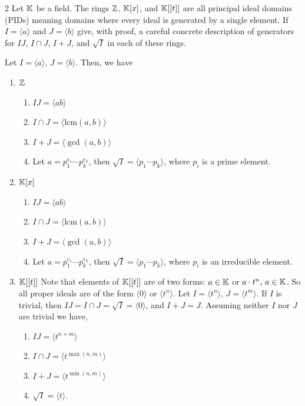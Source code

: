 \documentclass[Notebook.tex]{subfiles}
\begin{document}
\newpage 

\begin{problem}{2}
    Let $\mathbb K$ be a field. The rings $\mathbb Z$, $\mathbb K[x]$, and $\mathbb K[[t]]$ are all principal ideal domains (PIDs) meaning domains where every ideal is generated by a single element. If $I= \langle a \rangle$ and $J = \langle b \rangle$ give, with proof, a careful concrete description of generators for $IJ$, $I\cap J$, $I+J$, and $\sqrt{I}$ in each of these rings.
\end{problem}


\begin{solution}
    \bbni

    Let $I =  \langle a \rangle, \, J = \langle b \rangle$. Then, we have 
    \begin{enumerate}[label=(\alph*),ref=\theenumi\alph*]
        \item $\mathbb Z$ 
        \begin{enumerate}[label=(\roman*),ref=\theenumi\roman*]
            \item $IJ = \langle ab \rangle$ 
            \item $I \cap J = \langle \text{lcm} (a,b) \rangle$ 
            \item $I + J = \langle \gcd (a, b) \rangle$ 
            \item Let $a = p_1^{e_1}\cdots p_k^{e_k}$, then $\sqrt{I} = \langle p_1\cdots p_k \rangle$, where $p_i$ is a prime element. 
        \end{enumerate}
        \item $\mathbb K[x]$
        \begin{enumerate}[label=(\roman*),ref=\theenumi\roman*]
            \item $IJ = \langle ab \rangle$ 
            \item $I \cap J = \langle \text{lcm} (a,b) \rangle$ 
            \item $I + J = \langle \gcd (a, b)\rangle$ 
            \item Let $a = p_1^{e_1}\cdots p_k^{e_k}$, then $\sqrt{I} = \langle p_1\cdots p_k \rangle$, where $p_i$ is an irreducible element. 
        \end{enumerate}
        \item $\mathbb K[[t]]$
        Note that elements of $\mathbb K[[t]]$ are of two forms: $a \in \mathbb K$ or $a \cdot t^n, \, a\in \mathbb K$. So all proper ideals are of the form $\langle 0 \rangle$ or $\langle t^n \rangle$. Let $I = \langle t^n \rangle, \, J = \langle t^m \rangle$. 
        If $I$ is trivial, then $IJ = I \cap J = \sqrt{I} = \langle 0 \rangle$, and $I + J = J$. Assuming neither $I$ nor $J$ are trivial we have,
        \begin{enumerate}[label=(\roman*),ref=\theenumi\roman*]
            \item $IJ = \langle t^{n+m}\rangle$ 
            \item $I \cap J = \langle t^{\max(n,m)} \rangle$ 
            \item $I + J = \langle t^{\min(n,m)}\rangle$ 
            \item $\sqrt{I} = \langle t \rangle$. 
        \end{enumerate}
    \end{enumerate}
\end{solution}
\end{document}
